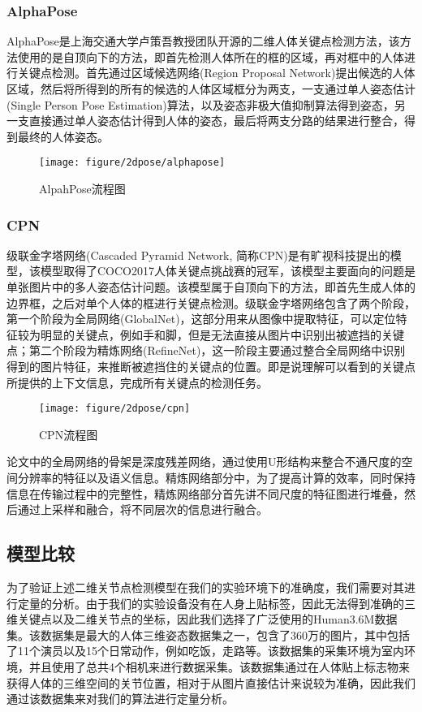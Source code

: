 \subsubsection{AlphaPose}
AlphaPose是上海交通大学卢策吾教授团队开源的二维人体关键点检测方法，该方法使用的是自顶向下的方法，即首先检测人体所在的框的区域，再对框中的人体进行关键点检测。首先通过区域候选网络(Region Proposal Network)提出候选的人体区域，然后将所得到的所有的候选的人体区域框分为两支，一支通过单人姿态估计(Single Person Pose Estimation)算法，以及姿态非极大值抑制算法得到姿态，另一支直接通过单人姿态估计得到人体的姿态，最后将两支分路的结果进行整合，得到最终的人体姿态。 
\begin{figure}[H]
    \centering
    \texttt{[image: figure/2dpose/alphapose]}
    \caption{\label{fig:2d-ap} AlpahPose流程图}
\end{figure}

\subsubsection{CPN}
级联金字塔网络(Cascaded Pyramid Network, 简称CPN)是有旷视科技提出的模型，该模型取得了COCO2017人体关键点挑战赛的冠军，该模型主要面向的问题是单张图片中的多人姿态估计问题。该模型属于自顶向下的方法，即首先生成人体的边界框，之后对单个人体的框进行关键点检测。级联金字塔网络包含了两个阶段，第一个阶段为全局网络(GlobalNet)，这部分用来从图像中提取特征，可以定位特征较为明显的关键点，例如手和脚，但是无法直接从图片中识别出被遮挡的关键点；第二个阶段为精炼网络(RefineNet)，这一阶段主要通过整合全局网络中识别得到的图片特征，来推断被遮挡住的关键点的位置。即是说理解可以看到的关键点所提供的上下文信息，完成所有关键点的检测任务。
\begin{figure}[H]
    \centering
    \texttt{[image: figure/2dpose/cpn]}
    \caption{\label{fig:2d-cpn} CPN流程图}
\end{figure}
论文中的全局网络的骨架是深度残差网络\cite{resnet}，通过使用U形结构来整合不通尺度的空间分辨率的特征以及语义信息。精炼网络部分中，为了提高计算的效率，同时保持信息在传输过程中的完整性，精炼网络部分首先讲不同尺度的特征图进行堆叠，然后通过上采样和融合，将不同层次的信息进行融合。

\subsection{模型比较}
为了验证上述二维关节点检测模型在我们的实验环境下的准确度，我们需要对其进行定量的分析。由于我们的实验设备没有在人身上贴标签，因此无法得到准确的三维关键点以及二维关节点的坐标，因此我们选择了广泛使用的Human3.6M数据集。该数据集是最大的人体三维姿态数据集之一，包含了360万的图片，其中包括了11个演员以及15个日常动作，例如吃饭，走路等。该数据集的采集环境为室内环境，并且使用了总共4个相机来进行数据采集。该数据集通过在人体贴上标志物来获得人体的三维空间的关节位置，相对于从图片直接估计来说较为准确，因此我们通过该数据集来对我们的算法进行定量分析。


